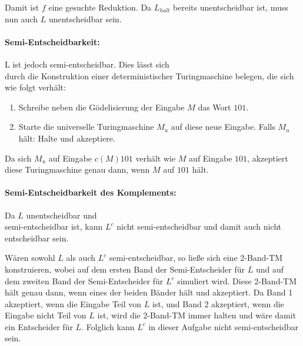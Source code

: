 \begin{example}
	Damit ist $f$ eine gesuchte Reduktion. Da $L_{halt}$ bereits
	unentscheidbar ist, muss nun auch $L$ unentscheidbar sein.
	\par

	\paragraph{Semi-Entscheidbarkeit:}
	L ist jedoch semi-entscheidbar. Dies lässt sich \\durch die Konstruktion
	einer deterministischer Turingmaschine belegen, die sich wie folgt
	verhält:
	\begin{enumerate}
		\item
			Schreibe neben die Gödelisierung der Eingabe $M$ das
			Wort $101$.
		\item
			Starte die universelle Turingmaschine $M_u$ auf diese
			neue Eingabe. Falls $M_u$ hält: Halte und akzeptiere.
	\end{enumerate}
	Da sich $M_u$ auf Eingabe $c(M)101$ verhält wie $M$ auf Eingabe $101$,
	akzeptiert diese Turingmaschine genau dann, wenn $M$ auf $101$ hält.
	\par

	\paragraph{Semi-Entscheidbarkeit des Komplements:}
	Da $L$ unentscheidbar und \\semi-entscheidbar ist, kann $L^c$ nicht
	semi-entscheidbar und damit auch nicht entscheidbar sein.

	Wären sowohl $L$ als auch $L^c$ semi-entscheidbar, so ließe sich eine 
	2-Band-TM konstruieren, wobei auf dem ersten Band der Semi-Entscheider 
	für $L$ und auf dem zweiten Band der Semi-Entscheider für $L^c$ 
	simuliert wird. Diese 2-Band-TM hält genau dann, wenn eines der beiden Bänder
	hält und akzeptiert. Da Band 1 akzeptiert, wenn die Eingabe Teil
	von $L$ ist, und Band 2 akzeptiert, wenn die Eingabe nicht Teil von $L$
	ist, wird die 2-Band-TM immer halten und wäre damit ein Entscheider für
	$L$. Folglich kann $L^c$ in dieser Aufgabe nicht semi-entscheidbar sein.
	\par
\end{example}
